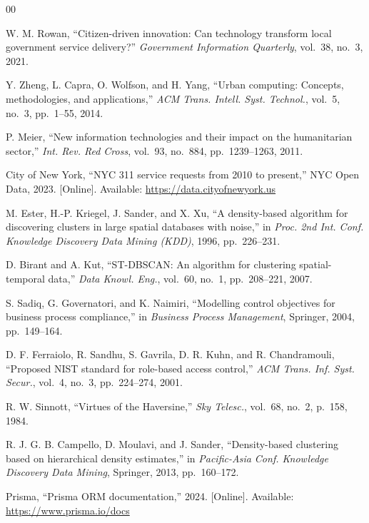 \documentclass[conference]{IEEEtran}
\begin{document}
\begin{thebibliography}{00}

 W. M. Rowan, ``Citizen-driven innovation: Can technology transform local government service delivery?'' \textit{Government Information Quarterly}, vol.~38, no.~3, 2021.

 Y. Zheng, L. Capra, O. Wolfson, and H. Yang, ``Urban computing: Concepts, methodologies, and applications,'' \textit{ACM Trans. Intell. Syst. Technol.}, vol.~5, no.~3, pp.~1--55, 2014.

 P. Meier, ``New information technologies and their impact on the humanitarian sector,'' \textit{Int. Rev. Red Cross}, vol.~93, no.~884, pp.~1239--1263, 2011.

 City of New York, ``NYC 311 service requests from 2010 to present,'' NYC Open Data, 2023. [Online]. Available: \url{https://data.cityofnewyork.us}

 M. Ester, H.-P. Kriegel, J. Sander, and X. Xu, ``A density-based algorithm for discovering clusters in large spatial databases with noise,'' in \textit{Proc. 2nd Int. Conf. Knowledge Discovery Data Mining (KDD)}, 1996, pp.~226--231.

 D. Birant and A. Kut, ``ST-DBSCAN: An algorithm for clustering spatial-temporal data,'' \textit{Data Knowl. Eng.}, vol.~60, no.~1, pp.~208--221, 2007.

 S. Sadiq, G. Governatori, and K. Naimiri, ``Modelling control objectives for business process compliance,'' in \textit{Business Process Management}, Springer, 2004, pp.~149--164.

 D. F. Ferraiolo, R. Sandhu, S. Gavrila, D. R. Kuhn, and R. Chandramouli, ``Proposed NIST standard for role-based access control,'' \textit{ACM Trans. Inf. Syst. Secur.}, vol.~4, no.~3, pp.~224--274, 2001.

 R. W. Sinnott, ``Virtues of the Haversine,'' \textit{Sky Telesc.}, vol.~68, no.~2, p.~158, 1984.

 R. J. G. B. Campello, D. Moulavi, and J. Sander, ``Density-based clustering based on hierarchical density estimates,'' in \textit{Pacific-Asia Conf. Knowledge Discovery Data Mining}, Springer, 2013, pp.~160--172.

 Prisma, ``Prisma ORM documentation,'' 2024. [Online]. Available: \url{https://www.prisma.io/docs}

\end{thebibliography}
\end{document}
